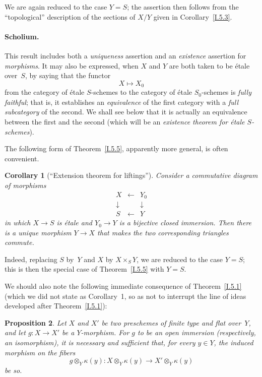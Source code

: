 \documentclass[11pt,oneside]{amsbook}
\newtheorem{proposition}{Proposition}[section]
\newtheorem{corollary}[proposition]{Corollary}
\begin{document}
We are again reduced to the case \(Y=S\); the assertion then follows
from the ``topological'' description of the sections of \(X/Y\) given
in Corollary~\ref{I.5.3}.

\paragraph{Scholium.}
This result includes both a \emph{uniqueness} assertion and an
\emph{existence} assertion for \emph{morphisms}.  It may also be
expressed, when \(X\) and \(Y\) are both taken to be étale over~\(S\),
by saying that the functor
\[
  X\longmapsto X_0
\]
from the category of étale \(S\)-schemes to the category of étale
\(S_0\)-schemes is \emph{fully faithful}; that is, it establishes an
\emph{equivalence} of the first category with a \emph{full subcategory}
of the second.  We shall see below that it is actually an equivalence
between the first and the second (which will be an \emph{existence
theorem for étale \(S\)-schemes}).

%
The following form of Theorem~\ref{I.5.5}, apparently more general, is
often convenient.

\begin{corollary}[``Extension theorem for liftings'']
\label{I.5.6}
Consider a commutative diagram of morphisms
\[
  \begin{array}{ccc}
    X & \longleftarrow & Y_0\\
    \downarrow && \downarrow\\
    S & \longleftarrow & Y
  \end{array}
\]
in which \(X\to S\) is étale and \(Y_0\to Y\) is a bijective closed
immersion.  Then there is a unique morphism \(Y\to X\) that makes the
two corresponding triangles commute.
\end{corollary}

Indeed, replacing \(S\) by~\(Y\) and \(X\) by \(X\times_S Y\), we are
reduced to the case \(Y=S\); this is then the special case of
Theorem~\ref{I.5.5} with \(Y=S\).

We should also note the following immediate consequence of
Theorem~\ref{I.5.1} (which we did not state as Corollary~1, so as not to
interrupt the line of ideas developed after Theorem~\ref{I.5.1}):

\begin{proposition}
\label{I.5.7}
Let \(X\) and \(X'\) be two preschemes of finite type and flat over~\(Y\),
and let \(g\colon X\to X'\) be a \(Y\)-morphism.  For \(g\) to be an open
immersion (respectively, an isomorphism), it is necessary and sufficient
that, for every \(y\in Y\), the induced morphism on the fibers
\[
  g\otimes_Y\kappa(y)\colon
  X\otimes_Y\kappa(y)
  \longrightarrow
  X'\otimes_Y\kappa(y)
\]
be so.
\end{proposition}
\end{document}
